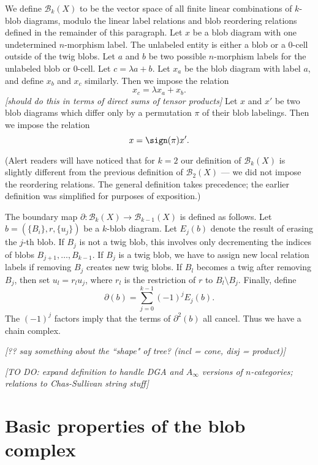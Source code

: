 \documentclass[11pt,leqno]{amsart}
\def\bc{{\mathcal B}}
\def\bd{\partial}
\def\setmin{\setminus}
\def\nn#1{{{\it \small [#1]}}}
\newcommand{\eq}[1]{\begin{displaymath}#1\end{displaymath}}
\begin{document}
We define $\bc_k(X)$ to be the vector space of all finite linear combinations
of $k$-blob diagrams, modulo the linear label relations and
blob reordering relations defined in the remainder of this paragraph.
Let $x$ be a blob diagram with one undetermined $n$-morphism label.
The unlabeled entity is either a blob or a 0-cell outside of the twig blobs.
Let $a$ and $b$ be two possible $n$-morphism labels for
the unlabeled blob or 0-cell.
Let $c = \lambda a + b$.
Let $x_a$ be the blob diagram with label $a$, and define $x_b$ and $x_c$ similarly.
Then we impose the relation
\eq{
    x_c = \lambda x_a + x_b .
}
\nn{should do this in terms of direct sums of tensor products}
Let $x$ and $x'$ be two blob diagrams which differ only by a permutation $\pi$
of their blob labelings.
Then we impose the relation
\eq{
    x = \sign(\pi) x' .
}

(Alert readers will have noticed that for $k=2$ our definition
of $\bc_k(X)$ is slightly different from the previous definition
of $\bc_2(X)$ --- we did not impose the reordering relations.
The general definition takes precedence;
the earlier definition was simplified for purposes of exposition.)

The boundary map $\bd : \bc_k(X) \to \bc_{k-1}(X)$ is defined as follows.
Let $b = (\{B_i\}, r, \{u_j\})$ be a $k$-blob diagram.
Let $E_j(b)$ denote the result of erasing the $j$-th blob.
If $B_j$ is not a twig blob, this involves only decrementing
the indices of blobs $B_{j+1},\ldots,B_{k-1}$.
If $B_j$ is a twig blob, we have to assign new local relation labels
if removing $B_j$ creates new twig blobs.
If $B_l$ becomes a twig after removing $B_j$, then set $u_l = r_lu_j$,
where $r_l$ is the restriction of $r$ to $B_l \setmin B_j$.
Finally, define
\eq{
    \bd(b) = \sum_{j=0}^{k-1} (-1)^j E_j(b).
}
The $(-1)^j$ factors imply that the terms of $\bd^2(b)$ all cancel.
Thus we have a chain complex.

\nn{?? say something about the ``shape" of tree? (incl = cone, disj = product)}


\nn{TO DO:
expand definition to handle DGA and $A_\infty$ versions of $n$-categories;
relations to Chas-Sullivan string stuff}



\section{Basic properties of the blob complex}
\end{document}
